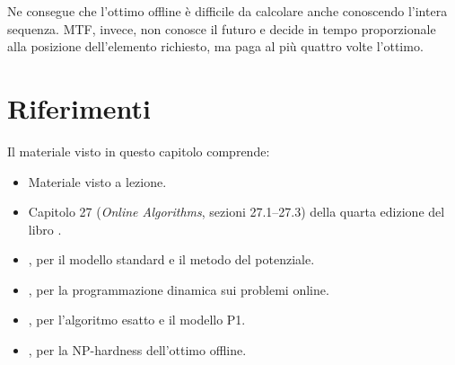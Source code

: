 Ne consegue che l'ottimo offline è difficile da calcolare anche conoscendo l'intera sequenza. MTF, invece, non conosce il futuro e decide in tempo proporzionale alla posizione dell'elemento richiesto, ma paga al più quattro volte l'ottimo.

\section*{Riferimenti}
Il materiale visto in questo capitolo comprende:
\begin{itemize}
    \item Materiale visto a lezione.
    \item Capitolo 27 (\emph{Online Algorithms}, sezioni 27.1--27.3) della quarta edizione del libro  \cite{Cormen-et-al-2022}.
    \item {} \cite{Sleator1985-ListUpdate}, per il modello standard e il metodo del potenziale.
    \item {} \cite{Manasse1988}, per la programmazione dinamica sui problemi online.
    \item {} \cite{Reingold1996}, per l'algoritmo esatto e il modello P1.
    \item {} \cite{Ambuhl2000}, per la NP-hardness dell'ottimo offline.
\end{itemize}
